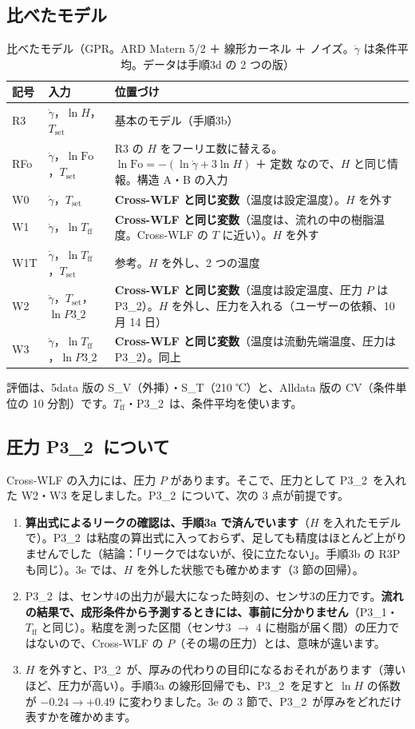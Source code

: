 \documentclass[paper=a4paper,fontsize=10.5pt,line_length=44zw,number_of_lines=38]{jlreq}
\newcommand{\gd}{\dot{\gamma}}
\newcommand{\Tff}{T_{\mathrm{ff}}}
\newcommand{\Tset}{T_{\mathrm{set}}}
\newcommand{\PI}{P3\_1}
\newcommand{\PII}{P3\_2}
\begin{document}
\subsection{比べたモデル}
\begin{table}[H]
\caption{比べたモデル（GPR。ARD Matern 5/2 ＋ 線形カーネル ＋ ノイズ。$\gd$ は条件平均。データは手順3d の 2 つの版）}\label{tab:models}
\begin{tabularx}{\linewidth}{@{}l>{\raggedright\arraybackslash}p{11\zw}X@{}}
\toprule
記号 & 入力 & 位置づけ \\
\midrule
R3 & $\gd$，$\ln H$，$\Tset$ & 基本のモデル（手順3b） \\
RFo & $\gd$，$\ln\mathrm{Fo}$，$\Tset$ & R3 の $H$ をフーリエ数に替える。$\ln\mathrm{Fo} = -(\ln\gd + 3\ln H)$ ＋ 定数 なので、$H$ と同じ情報。構造 A・B の入力 \\
W0 & $\gd$，$\Tset$ & \textbf{Cross-WLF と同じ変数}（温度は設定温度）。$H$ を外す \\
W1 & $\gd$，$\ln\Tff$ & \textbf{Cross-WLF と同じ変数}（温度は、流れの中の樹脂温度。Cross-WLF の $T$ に近い）。$H$ を外す \\
W1T & $\gd$，$\ln\Tff$，$\Tset$ & 参考。$H$ を外し、2 つの温度 \\
W2 & $\gd$，$\Tset$，$\ln\PII$ & \textbf{Cross-WLF と同じ変数}（温度は設定温度、圧力 $P$ は \PII）。$H$ を外し、圧力を入れる（ユーザーの依頼、10 月 14 日） \\
W3 & $\gd$，$\ln\Tff$，$\ln\PII$ & \textbf{Cross-WLF と同じ変数}（温度は流動先端温度、圧力は \PII）。同上 \\
\bottomrule
\end{tabularx}
\end{table}
評価は、5data 版の S\_V（外挿）・S\_T（210 ℃）と、Alldata 版の CV（条件単位の 10 分割）です。$\Tff$・\PII\ は、条件平均を使います。

\subsection{圧力 \PII\ について}
Cross-WLF の入力には、圧力 $P$ があります。そこで、圧力として \PII\ を入れた W2・W3 を足しました。\PII\ について、次の 3 点が前提です。
\begin{enumerate}[itemsep=0.3ex,topsep=0.5ex]
\item \textbf{算出式によるリークの確認は、手順3a で済んでいます}（$H$ を入れたモデルで）。\PII\ は粘度の算出式に入っておらず、足しても精度はほとんど上がりませんでした（結論：「リークではないが、役に立たない」。手順3b の R3P も同じ）。3e では、$H$ を外した状態でも確かめます（3 節の回帰）。
\item \PII\ は、センサ4の出力が最大になった時刻の、センサ3の圧力です。\textbf{流れの結果で、成形条件から予測するときには、事前に分かりません}（\PI・$\Tff$ と同じ）。粘度を測った区間（センサ3 $\to$ 4 に樹脂が届く間）の圧力ではないので、Cross-WLF の $P$（その場の圧力）とは、意味が違います。
\item $H$ を外すと、\PII\ が、厚みの代わりの目印になるおそれがあります（薄いほど、圧力が高い）。手順3a の線形回帰でも、\PII\ を足すと $\ln H$ の係数が $-0.24 \to +0.49$ に変わりました。3e の 3 節で、\PII\ が厚みをどれだけ表すかを確かめます。
\end{enumerate}
\end{document}
